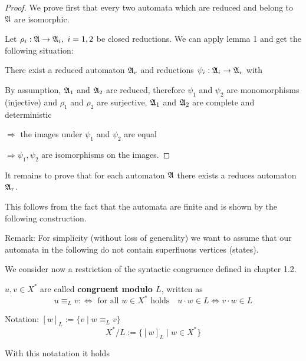 \begin{proof}
We prove first that every two automata which are reduced and belong to $\mbox{$\mathfrak{A}$}$
are isomorphic.

Let $\rho_i : \mbox{$\mathfrak{A}$} \to \mbox{$\mathfrak{A}$}_i,\ i = 1, 2$ be closed reductions. We can apply
lemma 1 and get the following situation:

There exist a reduced automaton $\mbox{$\mathfrak{A}$}_r$ and reductions $\psi_i : \mbox{$\mathfrak{A}$}_i
\to \mbox{$\mathfrak{A}$}_r$ with

\begin{center}
\end{center}

By assumption, $\mbox{$\mathfrak{A}$}_1$ and $\mbox{$\mathfrak{A}$}_2$ are reduced, therefore $\psi_1$ and
$\psi_2$ are monomorphisms (injective) and $\rho_1$ and $\rho_2$ are surjective,
$\mbox{$\mathfrak{A}$}_1$ and $\mbox{$\mathfrak{A}$}_2$	are complete and deterministic

$\Rightarrow$ the images under $\psi_1$ and $\psi_2$ are equal

$\Rightarrow \psi_1, \psi_2$ are isomorphisms on the images. 
\end{proof}

It remains to prove that for each automaton $\mbox{$\mathfrak{A}$}$ there exists a reduces
automaton $\mbox{$\mathfrak{A}$}_r$.

This follows from the fact that the automata are finite and is shown by the
following construction.

Remark: For simplicity (without loss of generality) we want to assume that our
automata in the following do not contain superfluous vertices (states).

We consider now a restriction of the syntactic congruence defined in chapter
1.2.

\begin{definition}
$u, v \in X^*$ are called {\bf congruent modulo $L$}, written as 
\[ u \equiv_L v :\iff \mbox{ for all } w \in X^* \mbox{ holds}\quad u \cdot w
\in L \iff v \cdot w \in L \]
\end{definition}

Notation: $[w]_L := \{ v \mid w \equiv_L v \}$
\[ X^*/L := \{ [w]_L \mid w \in X^* \} \]

With this notatation it holds

